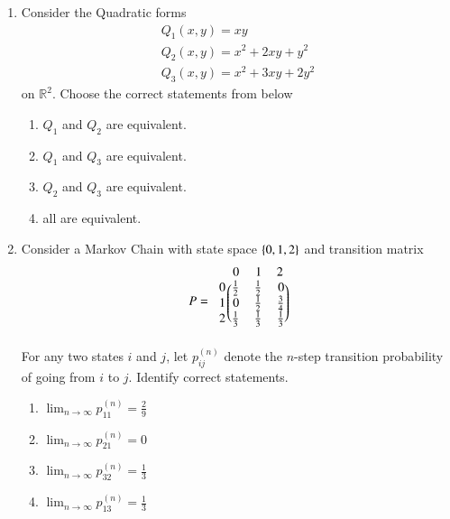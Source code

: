 \begin{enumerate}[label=\thesection.\arabic*.,ref=\thesection.\theenumi]
\item Consider the Quadratic forms
\begin{align}
Q_1(x,y) = xy
\\
Q_2(x,y) = x^2+2xy+y^2
\\
Q_3(x,y) = x^2+3xy+2y^2
\end{align}
%
on $\mathbb{R}^2$.  Choose the correct statements from below
\begin{enumerate}
\item $Q_1$ and $Q_2$ are equivalent.
\item $Q_1$ and $Q_3$ are equivalent.
\item $Q_2$ and $Q_3$ are equivalent.
\item all are equivalent.
\end{enumerate}
\solution

\item Consider a Markov Chain with state space $\left\{0,1,2\right\}$ and transition matrix
\begin{align}
P = 
\begin{blockarray}{c@{\hspace{1pt}}rrr@{\hspace{3pt}}}
         & 0   & 1   & 2 \\
        \begin{block}{r@{\hspace{3pt}}@{\hspace{1pt}}
    (@{\hspace{1pt}}rrr@{\hspace{1pt}}@{\hspace{1pt}})}
        0 & \frac{1}{2} & \frac{1}{2} & 0  \\
        1 & 0 &\frac{1}{2}  & \frac{3}{4}  \\
%
        2 &  \frac{1}{3} & \frac{1}{3} & \frac{1}{3}  \\
        \end{block}
    \end{blockarray}
\end{align}
For any two states $i$ and $j$, let $p_{ij}^{(n)}$ denote the $n$-step transition probability of going from $i$ to $j$.  Identify correct statements.
\begin{enumerate}
\item $\lim_{n \to \infty} p_{11}^{(n)} = \frac{2}{9}$
\item $\lim_{n \to \infty} p_{21}^{(n)} = 0$
\item $\lim_{n \to \infty} p_{32}^{(n)} = \frac{1}{3}$
\item $\lim_{n \to \infty} p_{13}^{(n)} = \frac{1}{3}$
\end{enumerate}
\solution


\end{enumerate}
